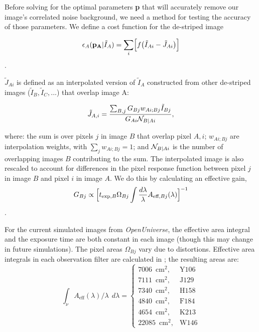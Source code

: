 \documentclass[12pt]{pasj01}
\begin{document}
Before solving for the optimal parameters \textbf{p} that will accurately remove our image's correlated noise background, we need a method for testing the accuracy of those parameters. 
We define a cost function for the de-striped image

\begin{equation}\label{eq:epsA} \epsilon_A(\mathbf{p_{A}}|\tilde{I}_A) = \sum_{i} \Bigl[ f \bigl( \tilde{I}_{Ai}-\tilde{J}_{Ai} \bigr) \Bigr]\end{equation}.

 $\tilde{J}_{Ai}$ is defined as an interpolated version of $\tilde{I}_A$ constructed from other de-striped images ($\tilde{I}_B, \tilde{I}_C, ...$) that overlap image A: 

\begin{equation} \label{eq:JAi}
\tilde{J}_{A, i} = \frac{\sum_{B,j} G_{Bj} w_{Ai;Bj}\tilde I_{Bj}}{G_{Ai}{\cal N}_{B|Ai}} ,
\end{equation}

where: the sum is over pixels $j$ in image $B$ that overlap pixel $A, i$; $w_{Ai;Bj}$ are interpolation weights, with $\sum_j w_{Ai;Bj}=1$; and ${\cal N}_{B|Ai}$ is the number of overlapping images $B$ contributing to the sum. The interpolated image is also rescaled to account for differences in the pixel response function between pixel $j$ in image $B$ and pixel $i$ in image $A$. We do this by calculating an effective gain,
\begin{equation}\label{eq:Geff}
    G_{Bj} \propto \Bigl[ t_{\text{exp},B} \Omega_{Bj} \int \frac{d\lambda}{\lambda} A_{\text{eff},Bj}(\lambda)\Bigr]^{-1}
\end{equation}.

For the current simulated images from \textit{OpenUniverse}, the effective area integral and the exposure time are both constant in each image (though this may change in future simulations). The pixel areas $\Omega_{Bj}$ vary due to distortions. Effective area integrals in each observation filter are calculated in \cite{Laliotis2024}; the resulting areas are:
\begin{equation}\label{eq:area}
    \int_{\nu} A_{\text{eff}}(\lambda) / \lambda \:\: d\lambda = 
    \begin{cases}
        7006\,  \text{ cm}^2, & \text{Y}106\\
        7111\,  \text{ cm}^2, & \text{J}129\\
        7340\,  \text{ cm}^2, & \text{H}158\\
        4840\,  \text{ cm}^2, & \text{F}184\\
        4654\,  \text{ cm}^2, & \text{K}213\\
        22085\,  \text{ cm}^2, & \text{W}146
    \end{cases}
\end{equation}
\end{document}
